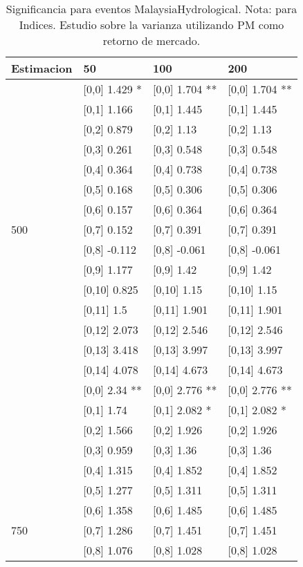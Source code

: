 \begin{table}

\caption{Significancia para eventos MalaysiaHydrological. Nota: para Indices. Estudio sobre la varianza utilizando PM como retorno de mercado.}
\centering
\begin{tabular}[t]{llll}
\toprule
Estimacion & 50 & 100 & 200\\
\midrule
 & {}[0,0] 1.429 * & {}[0,0] 1.704 ** & {}[0,0] 1.704 **\\
 & {}[0,1] 1.166 & {}[0,1] 1.445 & {}[0,1] 1.445\\
 & {}[0,2] 0.879 & {}[0,2] 1.13 & {}[0,2] 1.13\\
 & {}[0,3] 0.261 & {}[0,3] 0.548 & {}[0,3] 0.548\\
 & {}[0,4] 0.364 & {}[0,4] 0.738 & {}[0,4] 0.738\\
\addlinespace
 & {}[0,5] 0.168 & {}[0,5] 0.306 & {}[0,5] 0.306\\
 & {}[0,6] 0.157 & {}[0,6] 0.364 & {}[0,6] 0.364\\
500 & {}[0,7] 0.152 & {}[0,7] 0.391 & {}[0,7] 0.391\\
 & {}[0,8] -0.112 & {}[0,8] -0.061 & {}[0,8] -0.061\\
 & {}[0,9] 1.177 & {}[0,9] 1.42 & {}[0,9] 1.42\\
\addlinespace
 & {}[0,10] 0.825 & {}[0,10] 1.15 & {}[0,10] 1.15\\
 & {}[0,11] 1.5 & {}[0,11] 1.901 & {}[0,11] 1.901\\
 & {}[0,12] 2.073 & {}[0,12] 2.546 & {}[0,12] 2.546\\
 & {}[0,13] 3.418 & {}[0,13] 3.997 & {}[0,13] 3.997\\
 & {}[0,14] 4.078 & {}[0,14] 4.673 & {}[0,14] 4.673\\
\addlinespace
 & {}[0,0] 2.34 ** & {}[0,0] 2.776 ** & {}[0,0] 2.776 **\\
 & {}[0,1] 1.74 & {}[0,1] 2.082 * & {}[0,1] 2.082 *\\
 & {}[0,2] 1.566 & {}[0,2] 1.926 & {}[0,2] 1.926\\
 & {}[0,3] 0.959 & {}[0,3] 1.36 & {}[0,3] 1.36\\
 & {}[0,4] 1.315 & {}[0,4] 1.852 & {}[0,4] 1.852\\
\addlinespace
 & {}[0,5] 1.277 & {}[0,5] 1.311 & {}[0,5] 1.311\\
 & {}[0,6] 1.358 & {}[0,6] 1.485 & {}[0,6] 1.485\\
750 & {}[0,7] 1.286 & {}[0,7] 1.451 & {}[0,7] 1.451\\
 & {}[0,8] 1.076 & {}[0,8] 1.028 & {}[0,8] 1.028\\

\end{tabular}
\end{table}
